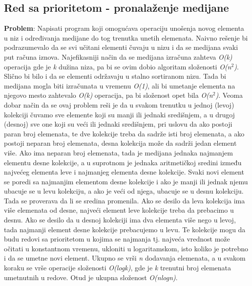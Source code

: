 \documentclass{article}
\begin{document}
\subsection{Red sa prioritetom - pronalaženje medijane}
\textbf{Problem}: Napisati program koji omogućava operaciju unošenja novog elementa
u niz i određivanja medijane do tog trenutka unetih elemenata.
\newline 
Naivno rešenje bi podrazumevalo da se svi učitani elementi čuvaju u nizu i da se
medijana svaki put računa iznova. Najefikasniji način da se medijana izračuna
zahteva \textit{O(k)} operacija gde je\textit{ k} dužina niza, pa bi se ovim dobio algoritam složenosti \textit{O(n$^2$)}. Slično bi bilo i da se elementi održavaju u stalno sortiranom
nizu. Tada bi medijana mogla biti izračunata u vremenu \textit{O(1)}, ali bi umetanje
elementa na njegovo mesto zahtevalo \textit{O(k)} operacija, pa bi složenost opet bila \textit{O(n$^2$)}.
\newline
Veoma dobar način da se ovaj problem reši je da u svakom trenutku u jednoj (levoj) kolekciji čuvamo sve elemente koji su manji ili jednaki središnjem, a
u drugoj (desnoj) sve one koji su veći ili jednaki središnjem, pri uslovu
da ako postoji paran broj elemenata, te dve kolekcije treba da sadrže isti broj
elemenata, a ako postoji neparan broj elemenata, desna kolekcija može da sadrži
jedan element više. Ako ima neparan broj elemenata, tada je medijana jednaka
najmanjem elementu desne kolekcije, a u suprotnom je jednaka aritmetičkoj
sredini između najvećeg elementa leve i najmanjeg elementa desne kolekcije. Svaki novi element se poredi sa najmanjim elementom desne kolekcije i ako
je manji ili jednak njemu ubacuje se u levu kolekciju, a ako je veći od njega,
ubacuje se u desnu kolekciju. Tada se proverava da li se sredina promenila. Ako
se desilo da leva kolekcija ima više elemenata od desne,
najveći element leve kolekcije treba da prebacimo u desnu. Ako se desilo da
u desnoj kolekciji ima dva elementa više nego u levoj, tada najmanji element
desne kolekcije prebacujemo u levu. Te
kolekcije mogu da budu redovi sa prioritetom u kojima se najmanja tj. najveća
vrednost može očitati u konstantnom vremenu, ukloniti u logaritamskom, isto koliko je potrebno i da se umetne novi element.
\newline
Ukupno se vrši \textit{n} dodavanja elemenata, a u svakom koraku se vrše operacije
složenosti \textit{O(logk)}, gde je \textit{k} trenutni broj elemenata umetnutnih u redove. Otud je ukupna složenost 
\textit{O(nlogn)}.
\end{document}
